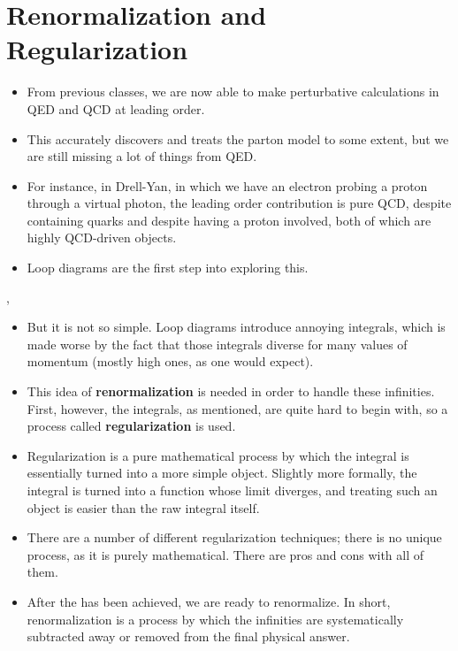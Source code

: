 \section*{Renormalization and Regularization}

\begin{itemize}
    \item From previous classes, we are now able to make perturbative calculations in QED and QCD at leading order.
    \item This accurately discovers and treats the parton model to some extent, but we are still missing a lot of things from QED.
    \item For instance, in Drell-Yan, in which we have an electron probing a proton through a virtual photon, the leading order contribution is pure QCD, despite containing quarks and despite having a proton involved, both of which are highly QCD-driven objects.
    \item Loop diagrams are the first step into exploring this.
\end{itemize}

\sep

\begin{itemize}
    \item But it is not so simple. Loop diagrams introduce annoying integrals, which is made worse by the fact that those integrals diverse for many values of momentum (mostly high ones, as one would expect).
    \item This idea of \textbf{renormalization} is needed in order to handle these infinities. First, however, the integrals, as mentioned, are quite hard to begin with, so a process called \textbf{regularization} is used.
    \item Regularization is a pure mathematical process by which the integral is essentially turned into a more simple object. Slightly more formally, the integral is turned into a function whose limit diverges, and treating such an object is easier than the raw integral itself.
    \item There are a number of different regularization techniques; there is no unique process, as it is purely mathematical. There are pros and cons with all of them.
    \item After the has been achieved, we are ready to renormalize. In short, renormalization is a process by which the infinities are systematically subtracted away or removed from the final physical answer.
\end{itemize}


